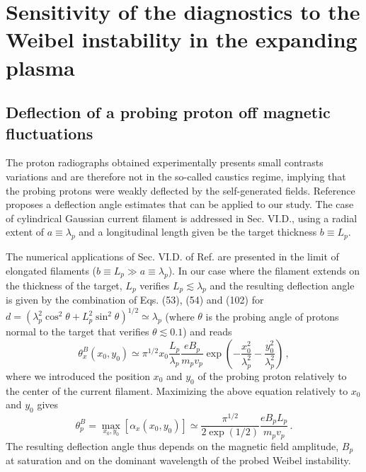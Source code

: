 \documentclass[aps,showpacs,superscriptaddress]{revtex4}
\begin{document}
\section{ Sensitivity of the diagnostics to the Weibel instability in the expanding plasma} 

\subsection{Deflection of a probing proton off magnetic fluctuations}
The proton radiographs obtained experimentally presents small contrasts variations and are therefore not in the so-called caustics regime, implying that the probing protons were weakly deflected by the self-generated fields.
Reference \cite[]{RSI_protograhyb} proposes a  deflection angle estimates that can be applied to our study.
The case of cylindrical Gaussian current filament is addressed in Sec. VI.D., using a radial extent of $a\equiv\lambda_p$ and a longitudinal length given be the target thickness $b\equiv L_p$.

The numerical applications of  Sec. VI.D. of Ref. \cite[]{RSI_protograhyb} are presented in the limit of   elongated filaments ($b\equiv L_p\gg a\equiv\lambda_p $). In our case where the filament  extends on the thickness of the target, $L_p$  verifies $ L_p \lesssim \lambda_p$ and the resulting deflection angle is given by the combination of Eqs. (53), (54) and (102) for $d = ( \lambda_p^2\cos^2\theta + L_p^2 \sin^2 \theta)^{1/2} \simeq  \lambda_p$ (where $\theta$ is the probing angle of protons normal to the target that verifies $\theta\lesssim 0.1$) and reads
\begin{equation}\label{eq:alphaphith}
\theta^B_x(x_0,y_0) \simeq \pi^{1/2} x_0 \frac{L_p }{\lambda_p}  \frac{e B_p }{m_p v_p} \exp\left(-\frac{x_0^2}{\lambda_p^2}-\frac{y_0^2}{ \lambda_p^2} \right)\, ,
\end{equation}
where we introduced the position $x_0$ and $y_0$ of the probing proton relatively to the center of the current filament.
Maximizing the above equation relatively to $x_0$ and $y_0$ gives
\begin{equation}
\theta^B_p = \max_{x_0,y_0}[\alpha_x(x_0,y_0) ] \simeq \frac{\pi^{1/2}}{2\exp(1/2)} \frac{e  B_p L_p }{m_p v_p}\, . \label{eq:alaphaphi}
\end{equation}
The resulting deflection angle thus depends on the magnetic field amplitude,  $  B_p$ at saturation and on the dominant wavelength of the probed Weibel instability.
\end{document}
